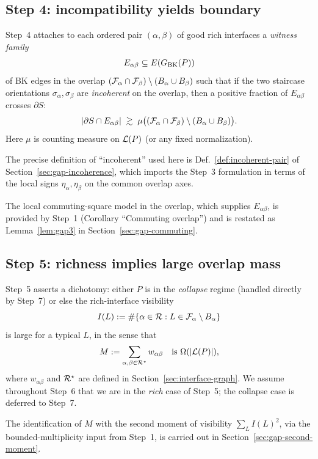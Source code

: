 \subsection{Step 4: incompatibility yields boundary}

Step~4 attaches to each ordered pair $(\alpha,\beta)$ of good rich
interfaces a \emph{witness family}
\[
E_{\alpha\beta}\subseteq E(G_{\mathrm{BK}}(P))
\]
of BK edges in the overlap
$(\mathcal{F}_{\alpha}\cap\mathcal{F}_{\beta})\setminus(B_\alpha\cup B_\beta)$
such that if the two staircase orientations
$\sigma_\alpha,\sigma_\beta$ are \emph{incoherent} on the overlap,
then a positive fraction of $E_{\alpha\beta}$ crosses $\partial S$:
\[
|\partial S \cap E_{\alpha\beta}| \;\gtrsim\;
\mu\big((\mathcal{F}_{\alpha}\cap\mathcal{F}_{\beta})\setminus(B_\alpha\cup B_\beta)\big).
\]
Here $\mu$ is counting measure on $\mathcal{L}(P)$ (or any fixed normalization).

The precise definition of ``incoherent'' used here is
Def.~\ref{def:incoherent-pair} of Section~\ref{sec:gap-incoherence},
which imports the Step~3 formulation in terms of the local signs
$\eta_\alpha,\eta_\beta$ on the common overlap axes.

The local commuting-square model in the overlap, which supplies
$E_{\alpha\beta}$, is provided by Step~1 (Corollary
``Commuting overlap'') and is restated as Lemma~\ref{lem:gap3}
in Section~\ref{sec:gap-commuting}.

\subsection{Step 5: richness implies large overlap mass}

Step~5 asserts a dichotomy: either $P$ is in the \emph{collapse} regime
(handled directly by Step~7) or else the rich-interface visibility
\[
I(L) := \#\{\alpha\in\mathcal{R} : L\in\mathcal{F}_{\alpha}\setminus B_\alpha\}
\]
is large for a typical $L$, in the sense that
\[
M := \sum_{\alpha,\beta\in\mathcal{R}^\star} w_{\alpha\beta}
\quad\text{is } \Omega(|\mathcal{L}(P)|),
\]
where $w_{\alpha\beta}$ and $\mathcal{R}^\star$ are defined in
Section~\ref{sec:interface-graph}.  We assume throughout Step~6 that we
are in the \emph{rich} case of Step~5; the collapse case is deferred to
Step~7.

The identification of $M$ with the second moment of visibility
$\sum_L I(L)^2$, via the bounded-multiplicity input from Step~1, is
carried out in Section~\ref{sec:gap-second-moment}.

